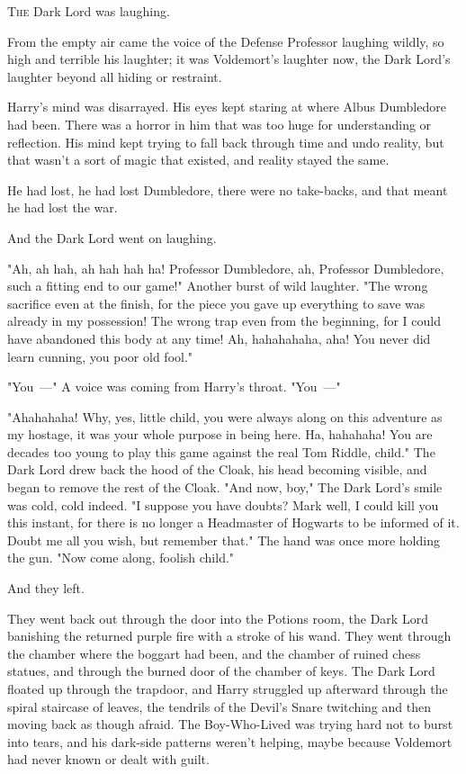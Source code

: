 
\lettrine{T}{he} Dark Lord was laughing.

From the empty air came the voice of the Defense Professor laughing wildly, so
high and terrible his laughter; it was Voldemort's laughter now, the Dark
Lord's laughter beyond all hiding or restraint.

Harry's mind was disarrayed. His eyes kept staring at where Albus Dumbledore
had been. There was a horror in him that was too huge for understanding or
reflection. His mind kept trying to fall back through time and undo reality,
but that wasn't a sort of magic that existed, and reality stayed the same.

He had lost, he had lost Dumbledore, there were no take-backs, and that meant
he had lost the war.

And the Dark Lord went on laughing.

"Ah, ah hah, ah hah hah ha! Professor Dumbledore, ah, Professor Dumbledore,
such a fitting end to our game!" Another burst of wild laughter. "The wrong
sacrifice even at the finish, for the piece you gave up everything to save was
already in my possession! The wrong trap even from the beginning, for I could
have abandoned this body at any time! Ah, hahahahaha, aha! You never did learn
cunning, you poor old fool."

"You~---" A voice was coming from Harry's throat. "You~---"

"Ahahahaha! Why, yes, little child, you were always along on this adventure as
my hostage, it was your whole purpose in being here. Ha, hahahaha! You are
decades too young to play this game against the real Tom Riddle, child." The
Dark Lord drew back the hood of the Cloak, his head becoming visible, and began
to remove the rest of the Cloak. "And now, boy,"  The Dark Lord's smile was cold, cold indeed. "I suppose you have
doubts? Mark well, I could kill you this instant, for there is no longer a
Headmaster of Hogwarts to be informed of it. Doubt me all you wish, but
remember that." The hand was once more holding the gun. "Now come along,
foolish child."

And they left.

They went back out through the door into the Potions room, the Dark Lord
banishing the returned purple fire with a stroke of his wand. They went through
the chamber where the boggart had been, and the chamber of ruined chess
statues, and through the burned door of the chamber of keys. The Dark Lord
floated up through the trapdoor, and Harry struggled up afterward through the
spiral staircase of leaves, the tendrils of the Devil's Snare twitching and
then moving back as though afraid. The Boy-Who-Lived was trying hard not to
burst into tears, and his dark-side patterns weren't helping, maybe because
Voldemort had never known or dealt with guilt.


